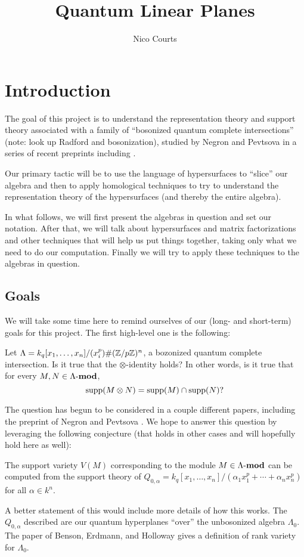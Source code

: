 \documentclass[12pt]{article}
\begin{document}
\title{Quantum Linear Planes}
\author{Nico Courts}
\date{}
\maketitle

\newpage
\tableofcontents
\newpage

\section{Introduction}
The goal of this project is to understand the representation theory and support theory associated with a family of ``bosonized quantum complete intersections'' (note: look up Radford and bosonization), studied by Negron and Pevtsova in a series of recent preprints including \cite{negron-pevtsovaI}.

Our primary tactic will be to use the language of hypersurfaces to ``slice'' our algebra and then to apply homological techniques to try to understand the representation theory of the hypersurfaces (and thereby the entire algebra). 

In what follows, we will first present the algebras in question and set our notation. After that, we will talk about hypersurfaces and matrix factorizations and other techniques that will help us put things together, taking only what we need to do our computation. Finally we will try to apply these techniques to the algebras in question.

\subsection{Goals}
We will take some time here to remind ourselves of our (long- and short-term) goals for this project. The first high-level one is the following:
\begin{qst}
    Let $\Lambda=k_q[x_1,\dots,x_n]/(x_i^p)\#(\mathbb{Z}/p\mathbb{Z})^n$, a bozonized quantum complete intersection. Is it true that the $\otimes$-identity holds? In other words, is it true that for every $M,N\in\Lambda\text{-}\mathbf{mod}$,
    \[\operatorname{supp}(M\otimes N)=\operatorname{supp}(M)\cap\operatorname{supp}(N)?\]
\end{qst}

The question has begun to be considered in a couple different papers, including the preprint of Negron and Pevtsova \cite{negron-pevtsovaI}. We hope to answer this question by leveraging the following conjecture (that holds in other cases and will hopefully hold here as well):
\begin{conj}
    The support variety $V(M)$ corresponding to the module $M\in\Lambda\text{-}\mathbf{mod}$ can be computed from the support theory of $Q_{0,\alpha}=k_q[x_1,\dots,x_n]/(\alpha_1x_1^p+\cdots+\alpha_nx_n^p)$ for all $\alpha\in k^n$.
\end{conj}
A better statement of this would include more details of how this works. The $Q_{0,\alpha}$ described are our quantum hyperplanes ``over'' the unbosonized algebra $\Lambda_0$. The paper of Benson, Erdmann, and Holloway \cite{benson-erdmann-holloway07} gives a definition of rank variety for $\Lambda_0$.
\end{document}
